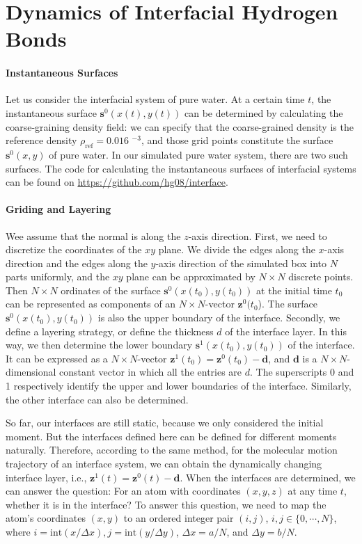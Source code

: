 \section{Dynamics of Interfacial Hydrogen Bonds} \label{ihb_and_selection}
\paragraph{Instantaneous Surfaces}
Let us consider the interfacial system of pure water.  At a certain time $t$, the instantaneous surface ${\mathbf s}^0(x(t),y(t))$ can be determined by calculating 
the coarse-graining density field: we can specify that the coarse-grained density is the reference density $\rho_\text{ref} = 0.016 $ \A$^{-3}$,
and those grid points constitute the surface ${\mathbf s}^0(x,y)$ of pure water. In our simulated pure water system, there are two such surfaces.
The code for calculating the instantaneous surfaces of interfacial systems can be found on \url{https://github.com/hg08/interface}. 
\paragraph{Griding and Layering}
Wee assume that the normal is along the $z$-axis direction. 
First, we need to discretize the coordinates of the $xy$ plane. 
We divide the edges along the $x$-axis direction and the edges along the $y$-axis direction of the simulated box into $N$ parts uniformly, 
and the $xy$ plane can be approximated by $N\times N$ discrete points. 
Then $N\times N$ ordinates of the surface ${\mathbf s}^0(x(t_0),y(t_0))$ at the initial time $t_0$ can be represented as components of an $N\times N$-vector ${\mathbf z}^0(t_0$). 
The surface ${\mathbf s}^0(x(t_0),y(t_0))$ is also the upper boundary of the interface.
Secondly, we define a layering strategy, or define the thickness $d$ of the interface layer. 
In this way, we then determine the lower boundary ${\mathbf s}^1(x(t_0),y(t_0))$ of the interface. 
It can be expressed as a $N\times N$-vector ${\mathbf z}^1(t_0)={\mathbf z}^0(t_0)-{\mathbf d}$, and ${\mathbf d}$ is a $N\times N$-dimensional constant 
vector in which all the entries are $d$. The superscripts 0 and 1 respectively identify the upper and lower boundaries of the interface. 
Similarly, the other interface can also be determined.

So far, our interfaces are still static, because we only considered the initial moment. 
But the interfaces defined here can be defined for different moments naturally. 
Therefore, according to the same method, for the molecular motion trajectory of an interface system, 
we can obtain the dynamically changing interface layer, i.e., ${\mathbf z}^1(t)={\mathbf z}^0(t)-{\mathbf d}$. 
When the interfaces are determined, we can answer the question: For an atom with coordinates $(x, y, z)$ at any time $t$, whether it is in the interface?
To answer this question, we need to map the atom's coordinates $(x, y)$ to an ordered integer pair $(i, j)$, $i,j \in  \{0,\cdots,N\}$, 
where $i = \text{int}(x /\Delta x), j = \text{int}(y/\Delta y)$, $\Delta x = a/N$, and $\Delta y = b/N$.
 
